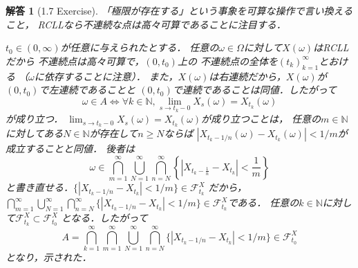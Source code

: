 \documentclass[dvipdfmx,autodetect-engine]{jsarticle}
\newtheorem*{ans}{解答}
\theoremstyle{remark}
\theoremstyle{definition}
\newcommand{\N}{\mathbb{N}}
\newcommand{\abs}[1]{\left\lvert#1\right\rvert}
\begin{document}
\begin{ans}[1.7 Exercise]
    「極限が存在する」という事象を可算な操作で言い換えること，
    RCLLなら不連続な点は高々可算であることに注目する．

    $t_{0} \in (0,\infty)$が任意に与えられたとする．
    任意の$\omega \in \Omega$に対して$X(\omega)$はRCLLだから
    不連続点は高々可算で，$(0,t_{0})$上の
    不連続点の全体を$(t_{k})_{k=1}^{\infty}$とおける
    （$\omega$に依存することに注意）．
    また，$X(\omega)$は右連続だから，$X(\omega)$が$(0,t_{0})$で左連続であることと
    $(0,t_{0})$で連続であることは同値．したがって
    \begin{equation}
        \omega \in A 
        \Leftrightarrow \forall k \in \N, 
        \lim_{s \to t_{k}-0} X_{s}(\omega) = X_{t_{k}}(\omega)
    \end{equation}
    が成り立つ．
    $\lim_{s \to t_{k}-0} X_{s}(\omega) = X_{t_{k}}(\omega)$が成り立つことは，
    任意の$m \in \N$に対してある$N \in \N$が存在して$n \geq N$ならば
    $\abs{X_{t_{k}-1/n}(\omega) - X_{t_{k}}(\omega)} < 1/m$が成立することと同値．
    後者は
    \begin{equation}
        \omega \in \bigcap_{m=1}^{\infty} \bigcup_{N=1}^{\infty} \bigcap_{n=N}^{\infty}
        \left\{ \abs{X_{t_{k}-\frac{1}{n}} - X_{t_{k}}} < \frac{1}{m} \right\}
    \end{equation}
    と書き直せる．$\{\abs{X_{t_{k}-1/n} - X_{t_{k}}} < 1/m\} \in \mathcal{F}_{t_{k}}^{X}$
    だから，$\bigcap_{m=1}^{\infty} \bigcup_{N=1}^{\infty} \bigcap_{n=N}^{\infty}
    \{\abs{X_{t_{k}-1/n} - X_{t_{k}}} < 1/m\} \in \mathcal{F}_{t_{k}}^{X}$である．
    任意の$k\in \N$に対して$\mathcal{F}_{t_{k}}^{X} \subset \mathcal{F}_{t_{0}}^{X}$
    となる．したがって
    \begin{equation}
        A = \bigcap_{k=1}^{\infty} \bigcap_{m=1}^{\infty} \bigcup_{N=1}^{\infty} \bigcap_{n=N}^{\infty}
    \{\abs{X_{t_{k}-1/n} - X_{t_{k}}} < 1/m\} \in \mathcal{F}_{t_{0}}^{X}
    \end{equation}
    となり，示された．
\end{ans}
\end{document}
